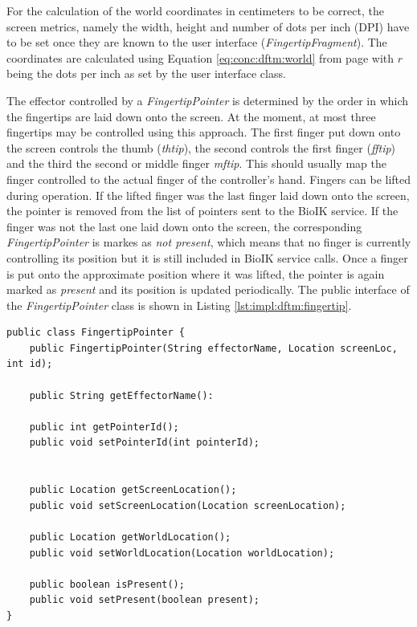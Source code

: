 For the calculation of the world coordinates in centimeters to be correct, the screen metrics, namely the width, height and number of dots per inch (DPI) have to be set once they are known to the user interface (\textit{FingertipFragment}). The coordinates are calculated using Equation \ref{eq:conc:dftm:world} from page \pageref{eq:conc:dftm:world} with $r$ being the dots per inch as set by the user interface class.

The effector controlled by a \textit{FingertipPointer} is determined by the order in which the fingertips are laid down onto the screen. At the moment, at most three fingertips may be controlled using this approach. The first finger put down onto the screen controls the thumb (\textit{thtip}), the second controls the first finger (\textit{fftip}) and the third the second or middle finger \textit{mftip}. This should usually map the finger controlled to the actual finger of the controller's hand. Fingers can be lifted during operation. If the lifted finger was the last finger laid down onto the screen, the pointer is removed from the list of pointers sent to the BioIK service. If the finger was not the last one laid down onto the screen, the corresponding \textit{FingertipPointer} is markes as \textit{not present}, which means that no finger is currently controlling its position but it is still included in BioIK service calls. Once a finger is put onto the approximate position where it was lifted, the pointer is again marked as \textit{present} and its position is updated periodically. The public interface of the \textit{FingertipPointer} class is shown in Listing \ref{lst:impl:dftm:fingertip}.

\begin{lstlisting}[caption={Public interface of the FingertipPointer class},label=lst:impl:dftm:fingertip]
public class FingertipPointer {
	public FingertipPointer(String effectorName, Location screenLoc, int id);
	
	public String getEffectorName():
	
	public int getPointerId();
	public void setPointerId(int pointerId);
	
	
	public Location getScreenLocation();
	public void setScreenLocation(Location screenLocation);
	
	public Location getWorldLocation();
	public void setWorldLocation(Location worldLocation);
	
	public boolean isPresent();
	public void setPresent(boolean present);
}

\end{lstlisting}
